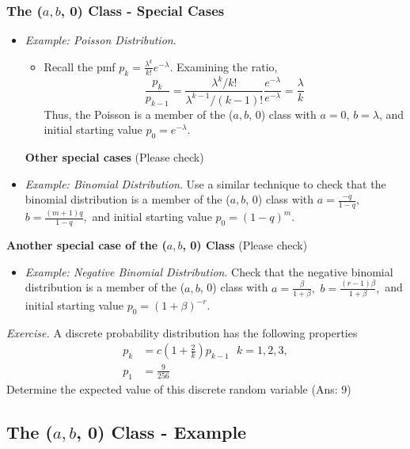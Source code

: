 \documentclass[]{book}
\providecommand{\tightlist}{%
  \setlength{\itemsep}{0pt}\setlength{\parskip}{0pt}}
\theoremstyle{definition}
\theoremstyle{definition}
\theoremstyle{definition}
\theoremstyle{remark}
\begin{document}
\subsubsection{\texorpdfstring{The (\(a, b\), 0) Class - Special
Cases}{The (a, b, 0) Class - Special Cases}}\label{the-a-b-0-class---special-cases}

\begin{itemize}
\item
  \emph{Example: Poisson Distribution}.

  \begin{itemize}
  \tightlist
  \item
    Recall the pmf \(p_k =\frac{\lambda^k}{k!}e^{-\lambda}\). Examining
    the ratio,
    \[\frac{p_k}{p_{k-1}} = \frac{\lambda^k/k!}{\lambda^{k-1}/(k-1)!}\frac{e^{-\lambda}}{e^{-\lambda}}= \frac{\lambda}{k}\]
    Thus, the Poisson is a member of the (\(a, b\), 0) class with
    \(a = 0\), \(b = \lambda\), and initial starting value
    \(p_0 = e^{-\lambda}\).
  \end{itemize}

  \textbf{Other special cases} (Please check)
\item
  \emph{Example: Binomial Distribution}. Use a similar technique to
  check that the binomial distribution is a member of the (\(a, b\), 0)
  class with \(a = \frac{-q}{1-q},\) \(b = \frac{(m+1)q}{1-q},\) and
  initial starting value \(p_0 = (1-q)^m\).
\end{itemize}

\textbf{Another special case of the (\(a, b\), 0) Class} (Please check)

\begin{itemize}
\tightlist
\item
  \emph{Example: Negative Binomial Distribution}. Check that the
  negative binomial distribution is a member of the (\(a, b\), 0) class
  with \(a = \frac{\beta}{1+\beta},\)
  \(b = \frac{(r-1)\beta}{1+\beta},\) and initial starting value
  \(p_0 = (1+\beta)^{-r}\).
\end{itemize}

\emph{Exercise.} A discrete probability distribution has the following
properties \[\begin{aligned}
p_k&=c\left( 1+\frac{2}{k}\right) p_{k-1} \:\:\: k=1,2,3,\\
p_1&= \frac{9}{256}\end{aligned}\] Determine the expected value of this
discrete random variable (Ans: 9)

\subsection{\texorpdfstring{The (\(a, b\), 0) Class -
Example}{The (a, b, 0) Class - Example}}\label{the-a-b-0-class---example}
\end{document}

